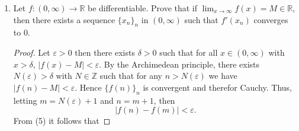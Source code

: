 \documentclass[12pt]{article}
\begin{document}
\begin{enumerate}
\begin{proof}
                Therefore $f$ is uniformly continuous over $(a, b)$. Now that
                uniform continuity has been established, we move on to showing
                the initial statement of this proof. \par\hspace{4mm}Let ${c_n}_n$ be any
                sequence of $(a, b)$ such that $c_n\to b$ as $n\to\infty$.
                Recall that every convergent sequence in Cauchy (since for any
                $\varepsilon>0$, there exists $N$ such that for all $n>N$,
                $|x_n-a|<\varepsilon/2$ and so for $m, n>N$, the triangle
                inequality gives us $|x_n-x_m|\leq
                |x_n-a|+|a-x_m|<\varepsilon$). With this we have that $\{c_n\}$ is
                Cauchy. Letting $\varepsilon>0$, then since $f$ is uniformly
                continuous, there exists $\delta>0$ such that for all $x,
                y\in(a, b)$ with $|x-y|<\delta$, then
                $|f(x)-f(y)|<\varepsilon$. Moreover, since $\{c_n\}$ is
                Cauchy, then there exists some $N$ such that for all $m, n\geq
                N$ we get $|c_n-c_m|<\delta$ and hence
                $|f(c_n)-f(c_m)|<\varepsilon$. Therefore, $\{f(c_n)\}$ is
                Cauchy and therefore convergent. Hence,
                $\lim_{n\to\infty}f(c_n)\in\mathbb{R}$ for all sequences in $(a,
                b)$ that converge to $b$. Therefore $\lim_{x\to b^-}f(x)$
                exists.   
            \end{proof}
        \item Let $f:(0, \infty)\to\mathbb{R}$ be differentiable. Prove that if
            $\lim_{x\to\infty}f(x)=M\in\mathbb{R}$, then there exists
            a sequence $\{x_n\}_n$ in $(0, \infty)$ such that $f'(x_n)$
            converges to 0.
            \begin{proof}
               Let $\varepsilon>0$ then there exists $\delta>0$ such that for
               all $x\in (0, \infty)$ with $x>\delta$, $|f(x)-M|<\varepsilon$.
               By the Archimedean principle, there exists $N(\varepsilon)>\delta$ with
               $N\in\mathbb{Z}$ such that for any $n>N(\varepsilon)$ we have
               $|f(n)-M|<\varepsilon$. Hence $\{f(n)\}_n$ is convergent and
               therefor Cauchy. Thus, letting $m=N(\varepsilon)+1$ and $n=m+1$,
               then 
               \begin{equation}
                   |f(n)-f(m)|<\varepsilon.
               \end{equation}
               From (5) it follows that 

\end{proof}
\end{enumerate}
\end{document}
